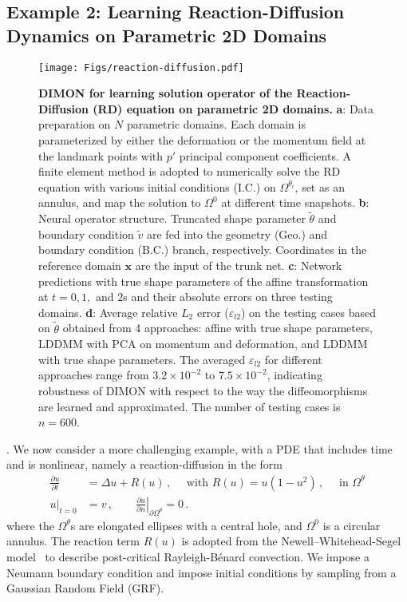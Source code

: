 \documentclass[review]{elsarticle}
\def\Omegatheta{{\Omega^\theta}}
\def\Omegathetai{{\Omega^{\theta_i}}}
\def\refd{0}
\def\Omegaref{{\Omega^\refd}}
\begin{document}
\subsection{Example 2: Learning Reaction-Diffusion Dynamics on Parametric 2D Domains}
\label{subsec:rd}

\begin{figure}
    \centering
	\texttt{[image: Figs/reaction-diffusion.pdf]} 
    \caption{\textbf{DIMON for learning solution operator of the Reaction-Diffusion (RD) equation on parametric 2D domains.} {\bf a}: Data preparation on $N$ parametric domains. Each domain is parameterized by either the deformation or the momentum field at the landmark points with $p'$ principal component coefficients. A finite element method is adopted to numerically solve the RD equation with various initial conditions (I.C.) on $\Omegathetai$, set as an annulus, and map the solution to $\Omegaref$ at different time snapshots. {\bf b}: Neural operator structure. Truncated shape parameter $\tilde \theta$ and boundary condition $\tilde v$ are fed into the geometry (Geo.) and boundary condition (B.C.) branch, respectively. Coordinates in the reference domain $\mathbf{x}$ are the input of the trunk net. {\bf c}: Network predictions with true shape parameters of the affine transformation at $t = 0, 1,$ and $2$s and their absolute errors on three testing domains. {\bf d}: Average relative $L_{2}$ error ($\varepsilon_{l2}$) on the testing cases based on $\tilde \theta$ obtained from 4 approaches: affine with true shape parameters, LDDMM with PCA on momentum and deformation, and LDDMM with true shape parameters. The averaged $\varepsilon_{l2}$ for different approaches range from $3.2\times10^{-2}$ to $7.5\times 10^{-2}$, indicating robustness of DIMON with respect to the way the diffeomorphisms are learned and approximated. The number of testing cases is $n=600$.}
    \label{fig:rd}
\end{figure}

. We now consider a more challenging example, with a PDE that includes time and is nonlinear, namely a reaction-diffusion in the form
\begin{align*}
    \frac{\partial u}{\partial t} &= \Delta u + R(u)\,,\quad \text{ with } R(u) = u(1-u^{2})\,,\quad \text{ in } \Omegatheta\\    
    u|_{t=0} &=v \,,\qquad\left.\frac{\partial u}{\partial n}\right|_{\partial\Omegatheta} = 0\,.
\end{align*}
where the $\Omegatheta$s are elongated ellipses with a central hole, and $\Omegaref$ is a circular annulus. 
The reaction term $R(u)$ is adopted from the Newell–Whitehead-Segel model~\cite{newell1969finite} to describe post-critical Rayleigh-B\'enard convection. We impose a Neumann boundary condition and impose initial conditions by sampling from a Gaussian Random Field (GRF). 
\end{document}

